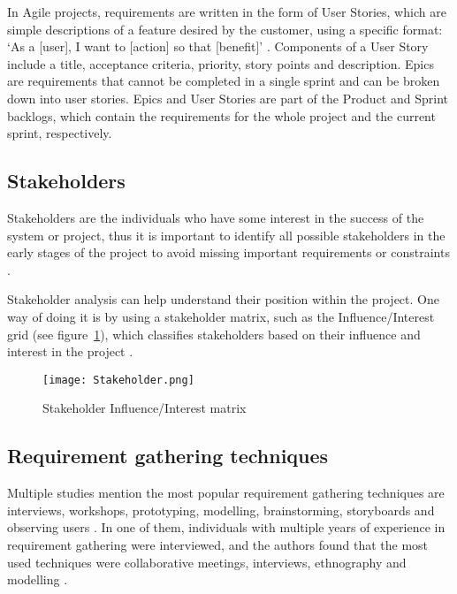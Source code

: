 In Agile projects, requirements are written in the form of User Stories, which are simple descriptions of a feature desired by the customer, using a specific format: `As a [user], I want to [action] so that [benefit]' \parencite[191]{requirements}. Components of a User Story include a title, acceptance criteria, priority, story points and description. Epics are requirements that cannot be completed in a single sprint and can be broken down into user stories. Epics and User Stories are part of the Product and Sprint backlogs, which contain the requirements for the whole project and the current sprint, respectively.

\subsection{Stakeholders}\label{sec:stakeholders}

Stakeholders are the individuals who have some interest in the success of the system or project, thus it is important to identify all possible stakeholders in the early stages of the project to avoid missing important requirements or constraints \parencite[34]{requirements}. 

Stakeholder analysis can help understand their position within the project. One way of doing it is by using a stakeholder matrix, such as the Influence/Interest grid (see figure~\ref{fig:stakeholder_matrix}), which classifies stakeholders based on their influence and interest in the project \parencite{stakeholders,stakeholders2}.

\begin{figure}[ht]
    \centering
    \texttt{[image: Stakeholder.png]}
    \caption{Stakeholder Influence/Interest matrix}\label{fig:stakeholder_matrix}
\end{figure}

\subsection{Requirement gathering techniques}

Multiple studies mention the most popular requirement gathering techniques are interviews, workshops, prototyping, modelling, brainstorming, storyboards and observing users \parencite{reqanalysis1,reqanalysis2, reqanalysis3, reqanalysis4}. In one of them, individuals with multiple years of experience in requirement gathering were interviewed, and the authors found that the most used techniques were collaborative meetings, interviews, ethnography and modelling \parencite{reqanalysis1}.

